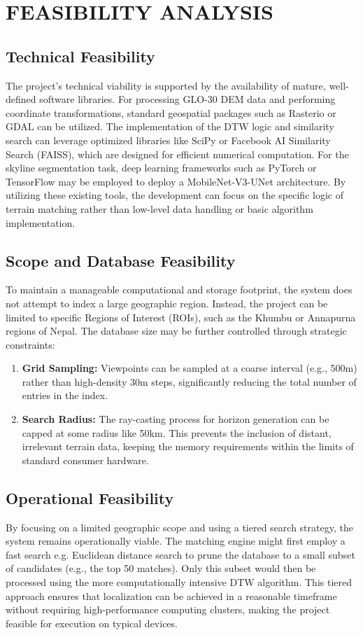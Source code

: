 \chapter{FEASIBILITY ANALYSIS}

\section{Technical Feasibility}
The project’s technical viability is supported by the availability of mature, well-defined software libraries. For processing GLO-30 DEM data and performing coordinate transformations, standard geospatial packages such as Rasterio or GDAL can be utilized. The implementation of the DTW logic and similarity search can leverage optimized libraries like SciPy or Facebook AI Similarity Search (FAISS), which are designed for efficient numerical computation. For the skyline segmentation task, deep learning frameworks such as PyTorch or TensorFlow may be employed to deploy a MobileNet-V3-UNet architecture. By utilizing these existing tools, the development can focus on the specific logic of terrain matching rather than low-level data handling or basic algorithm implementation.

\section{Scope and Database Feasibility}
To maintain a manageable computational and storage footprint, the system does not attempt to index a large geographic region. Instead, the project can be limited to specific Regions of Interest (ROIs), such as the Khumbu or Annapurna regions of Nepal. The database size may be further controlled through strategic constraints:
\begin{enumerate}
    \item \textbf{Grid Sampling:} Viewpoints can be sampled at a coarse interval (e.g., 500m) rather than high-density 30m steps, significantly reducing the total number of entries in the index.
    \item \textbf{Search Radius:} The ray-casting process for horizon generation can be capped at some radius like 50km. This prevents the inclusion of distant, irrelevant terrain data, keeping the memory requirements within the limits of standard consumer hardware.
\end{enumerate}

\section{Operational Feasibility}
By focusing on a limited geographic scope and using a tiered search strategy, the system remains operationally viable. The matching engine might first employ a fast search e.g. Euclidean distance search to prune the database to a small subset of candidates (e.g., the top 50 matches). Only this subset would then be processed using the more computationally intensive DTW algorithm. This tiered approach ensures that localization can be achieved in a reasonable timeframe without requiring high-performance computing clusters, making the project feasible for execution on typical devices.
